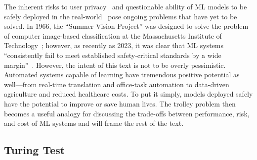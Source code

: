 The inherent risks to user privacy~\cite{abelson2021bugs} and questionable ability of ML models to be safely deployed in the real-world~\cite{meyers,croce_reliable_2020,dohmatob_generalized_2019,meyers_aft,meyers} pose ongoing problems that have yet to be solved.
In 1966, the ``Summer Vision Project'' was designed to solve the problem of computer image-based classification at the Massachusetts Institute of Technology~\cite{summervision}; however, as recently as 2023, it was clear that ML systems ``consistently fail to meet established safety-critical standards by a wide margin''~\cite{meyers}.
However, the intent of this text is not to be overly pessimistic. 
Automated systems capable of learning have tremendous positive potential as well---from real-time translation and office-task automation to data-driven agriculture and reduced healthcare costs. 
To put it simply, models deployed safely have the potential to improve or save human lives. 
The trolley problem then becomes a useful analogy for discussing the trade-offs between performance, risk, and cost of ML systems and will frame the rest of the text.


\subsection{Turing Test}

